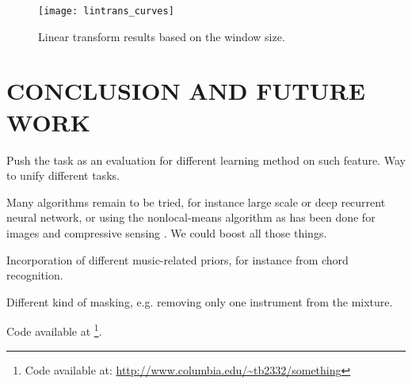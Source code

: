 \documentclass{article}
\begin{document}
\begin{figure}[t]
\begin{center}
\texttt{[image: lintrans\_curves]}
\end{center}
\caption{Linear transform results based on the window size.}
\label{fig:lintrans}
\end{figure}


\section{CONCLUSION AND FUTURE WORK}
\label{sec:conclusion}
Push the task as an evaluation for different learning method on such feature.
Way to unify different tasks.

Many algorithms remain to be tried, for instance large scale or deep recurrent
neural network, or using the nonlocal-means algorithm as has been done for
images \cite{Buades2005} and compressive sensing \cite{Gemmeke2008}.
We could boost all those things.

Incorporation of different music-related priors, for instance from chord recognition.

Different kind of masking, e.g. removing only one instrument from the mixture.

Code available at \footnote{Code available at: \url{http://www.columbia.edu/~tb2332/something}}.





\end{document}
